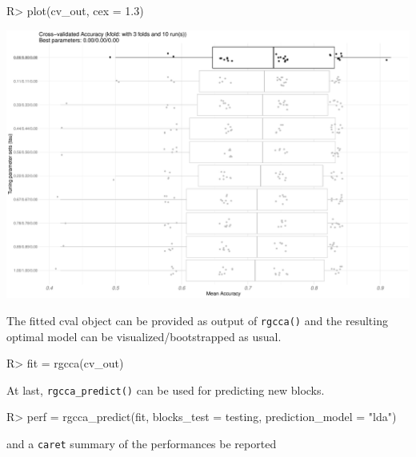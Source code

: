 \documentclass[
]{jss}
\begin{document}
\begin{CodeChunk}
\begin{CodeInput}
R> plot(cv_out, cex = 1.3)
\end{CodeInput}


\begin{center}\includegraphics{RGCCA_21022023_files/figure-latex/unnamed-chunk-28-1} \end{center}

\end{CodeChunk}

\normalsize

The fitted cval object can be provided as output of \texttt{rgcca()} and
the resulting optimal model can be visualized/bootstrapped as usual.

\footnotesize

\begin{CodeChunk}
\begin{CodeInput}
R> fit = rgcca(cv_out)
\end{CodeInput}
\end{CodeChunk}

\normalsize

At last, \texttt{rgcca\_predict()} can be used for predicting new
blocks.

\footnotesize

\begin{CodeChunk}
\begin{CodeInput}
R> perf = rgcca_predict(fit, blocks_test = testing, prediction_model = "lda")
\end{CodeInput}
\end{CodeChunk}

\normalsize

and a \texttt{caret} summary of the performances be reported
\end{document}
